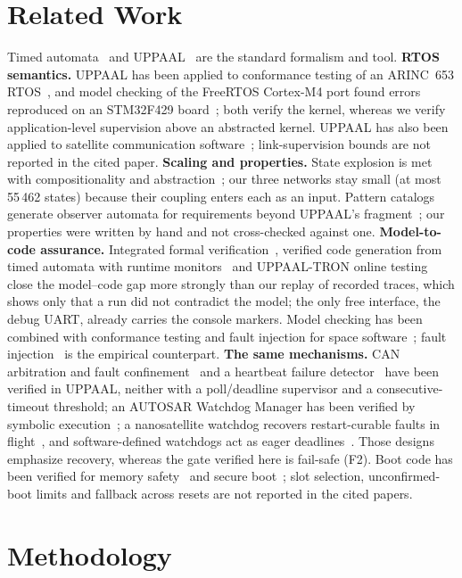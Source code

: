 \documentclass[conference,a4paper]{IEEEtran}
\newif\ifrerunmarks
\DeclareRobustCommand{\rerun}[1]{\ifrerunmarks\textcolor{red}{#1}\else#1\fi}
\begin{document}
\section{Related Work}
Timed automata~\cite{alur1994} and UPPAAL~\cite{larsen1997,behrmann2004} are the standard formalism and tool.
\textbf{RTOS semantics.} UPPAAL has been applied to conformance testing of an ARINC~653 RTOS~\cite{singh2021}, and model checking of the FreeRTOS Cortex-M4 port found errors reproduced on an STM32F429 board~\cite{lin2024}; both verify the kernel, whereas we verify application-level supervision above an abstracted kernel. UPPAAL has also been applied to satellite communication software~\cite{alencar2014}; link-supervision bounds are not reported in the cited paper.
\textbf{Scaling and properties.} State explosion is met with compositionality and abstraction~\cite{jensen2000}; our three networks stay small (\rerun{at most 55\,462 states}) because their coupling enters each as an input. Pattern catalogs generate observer automata for requirements beyond UPPAAL's fragment~\cite{vogel2023}; our properties were written by hand and not cross-checked against one.
\textbf{Model-to-code assurance.} Integrated formal verification~\cite{ge2018}, verified code generation from timed automata with runtime monitors~\cite{cho2025} and UPPAAL-TRON online testing~\cite{larsen2005} close the model--code gap more strongly than our replay of recorded traces, which shows only that a run did not contradict the model; the only free interface, the debug UART, already carries the console markers. Model checking has been combined with conformance testing and fault injection for space software~\cite{pontes2014}; fault injection~\cite{arlat1990,batista2019} is the empirical counterpart.
\textbf{The same mechanisms.} CAN arbitration and fault confinement~\cite{pan2014} and a heartbeat failure detector~\cite{johansson2020} have been verified in UPPAAL, neither with a poll/deadline supervisor and a consecutive-timeout threshold; an AUTOSAR Watchdog Manager has been verified by symbolic execution~\cite{ahmed2018}; a nanosatellite watchdog recovers restart-curable faults in flight~\cite{cutler2022}, and software-defined watchdogs act as eager deadlines~\cite{asch2025}. Those designs emphasize recovery, whereas the gate verified here is fail-safe (F2). Boot code has been verified for memory safety~\cite{cook2020} and secure boot~\cite{vasudevan2024}; slot selection, unconfirmed-boot limits and fallback across resets are not reported in the cited papers.

\section{Methodology}
\label{sec:method}
\end{document}
